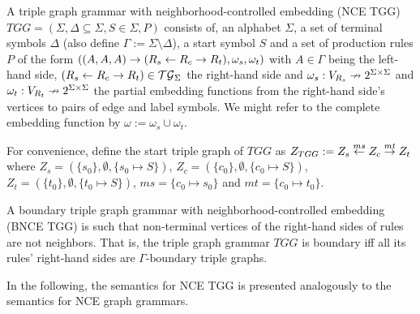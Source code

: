 \documentclass[]{report}
\begin{document}
\begin{definition}
	A triple graph grammar with neighborhood-controlled embedding (NCE TGG) $TGG = (\Sigma, \Delta \subseteq \Sigma, S \in \Sigma, P)$ consists of, an alphabet $\Sigma$, a set of terminal symbols $\Delta$ (also define $\Gamma := \Sigma \setminus \Delta$), a start symbol $S$ and a set of production rules $P$ of the form $((A,A,A) \to (R_s \overset{}{\leftarrow} R_c \overset{}{\rightarrow} R_t), \omega_s, \omega_t)$ with $A \in \Gamma$ being the left-hand side, $(R_s \overset{}{\leftarrow} R_c \overset{}{\rightarrow} R_t) \in \mathcal{TG}_{\Sigma}$ the right-hand side and $\omega_s : V_{R_s} \nrightarrow 2^{\Sigma \times \Sigma}$ and $\omega_t : V_{R_t} \nrightarrow 2^{\Sigma \times \Sigma}$ the partial embedding functions from the right-hand side's vertices to pairs of edge and label symbols. We might refer to the complete embedding function by $\omega:= \omega_s \cup \omega_t$.
	
	For convenience, define the start triple graph of $TGG$ as $Z_{TGG} := Z_s \overset{ms}{\leftarrow} Z_c \overset{mt}{\rightarrow} Z_t$ where $Z_s = (\{s_0\},\emptyset,\{s_0 \mapsto S\})$, $Z_c = (\{c_0\},\emptyset,\{c_0 \mapsto S\})$, $Z_t = (\{t_0\},\emptyset,\{t_0 \mapsto S\})$, $ms = \{c_0 \mapsto s_0 \}$ and $mt = \{c_0 \mapsto t_0 \}$.
	
\end{definition}

\begin{definition}
	A boundary triple graph grammar with neighborhood-controlled embedding (BNCE TGG) is such that non-terminal vertices of the right-hand sides of rules are not neighbors. That is, the triple graph grammar $TGG$ is boundary iff all its rules' right-hand sides are $\Gamma\text{-boundary}$ triple graphs.
\end{definition}


In the following, the semantics for NCE TGG is presented analogously to the semantics for NCE graph grammars.
\end{document}
